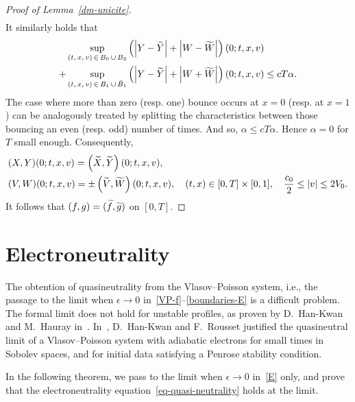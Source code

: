 \documentclass[AHL,Unicode,longabstracts,published]{cedram}
\let\oldtilde\tilde
\renewcommand*{\tilde}[1]{\mathchoice{\widetilde{#1}}{\widetilde{#1}}{\oldtilde{#1}}{\oldtilde{#1}}}
\begin{document}
\begin{proof}[{Proof of Lemma~\ref{dm-unicite}}]
\begin{align*}
\end{align*}
It similarly holds that
\begin{align*}
&\sup_{(t,\,x,\,v)\,\in\,B_0\,\cup\,B_2} \left(\left|Y-\tilde{Y}\right|+\left|W-\tilde{W}\right|\right)(0;t,x,v)\\
 + &\sup_{(t,\,x,\,v)\,\in\,B_1\,\cup\,\bar{B}_1} \left(\left|Y-\tilde{Y}\right|+\left|W+\tilde{W}\right|\right)(0;t,x,v) \leq cT\alpha.
\end{align*}
The case where more than zero (resp. one) bounce occurs at $x=0$ (resp. at $x=1$) can be analogously treated by splitting the characteristics between those bouncing an even (resp. odd) number of times. And so, $\alpha \leq cT\alpha $. Hence $\alpha = 0$ for $T$ small enough. Consequently,
\begin{align*}
&(X,Y)(0;t,x,v)= \left(\tilde{X},\tilde{Y}\right)(0;t,x,v),\\
&(V,W)(0;t,x,v)= \pm \left(\tilde{V},\tilde{W}\right)(0;t,x,v),\quad (t,x) \in [0,T] \times [0,1], \quad \frac{c_0}{2} \leq |v| \leq 2V_0.
\end{align*}
It follows that $(f,g)= (\tilde{f},\tilde{g})$ on $[0,T]$.
\end{proof}



\section{Electroneutrality}\label{th-electroneutralite}

The obtention of quasineutrality from the Vlasov--Poisson system, i.e., the passage to the limit when $\epsilon \to 0$ in~\eqref{VP-f}--\eqref{boundaries-E} is a difficult problem. The formal limit does not hold for unstable profiles, as proven by D.~Han-Kwan and M.~Hauray in~\cite{Han15}. In~\cite{Han16}, D.~Han-Kwan and F.~Rousset justified the quasineutral limit of a Vlasov--Poisson system with adiabatic electrons for small times in Sobolev spaces, and for initial data satisfying a Penrose stability condition.


In the following theorem, we pass to the limit when $\epsilon \rightarrow 0$ in~\eqref{E} only, and prove that the electroneutrality equation~\eqref{eq-quasi-neutrality} holds at the limit.
\end{document}
